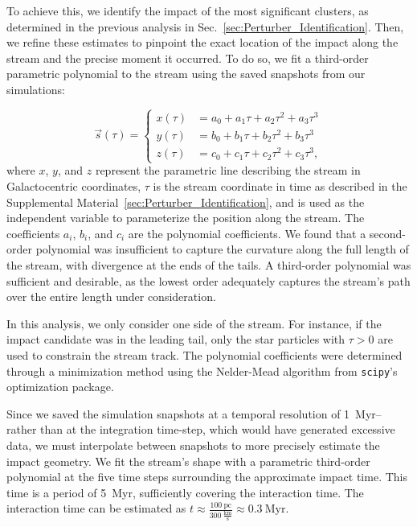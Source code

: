         To achieve this, we identify the impact of the most significant clusters, as determined in the previous analysis in Sec.~\ref{sec:Perturber_Identification}. Then, we refine these estimates to pinpoint the exact location of the impact along the stream and the precise moment it occurred. To do so, we fit a third-order parametric polynomial to the stream using the saved snapshots from our simulations:

        \begin{equation}
            \vec{s}(\tau) = 
            \left\{
            \begin{aligned}
                x(\tau) &= a_0 + a_1 \tau + a_2 \tau^2 + a_3 \tau^3 \\ 
                y(\tau) &= b_0 + b_1 \tau + b_2 \tau^2 + b_3 \tau^3 \\
                z(\tau) &= c_0 + c_1 \tau + c_2 \tau^2 + c_3 \tau^3,
            \end{aligned}
            \right.
        \end{equation}
        where $x$, $y$, and $z$ represent the parametric line describing the stream in Galactocentric coordinates, $\tau$ is the stream coordinate in time as described in the Supplemental Material~\ref{sec:Perturber_Identification}, and is used as the independent variable to parameterize the position along the stream. The coefficients $a_i$, $b_i$, and $c_i$ are the polynomial coefficients. We found that a second-order polynomial was insufficient to capture the curvature along the full length of the stream, with divergence at the ends of the tails. A third-order polynomial was sufficient and desirable, as the lowest order adequately captures the stream's path over the entire length under consideration.

        In this analysis, we only consider one side of the stream. For instance, if the impact candidate was in the leading tail, only the star particles with $\tau > 0$ are used to constrain the stream track. The polynomial coefficients were determined through a minimization method using the Nelder-Mead algorithm from \texttt{scipy}'s optimization package.

        Since we saved the simulation snapshots at a temporal resolution of 1~Myr--rather than at the integration time-step, which would have generated excessive data, we must interpolate between snapshots to more precisely estimate the impact geometry. We fit the stream's shape with a parametric third-order polynomial at the five time steps surrounding the approximate impact time. This time is a period of 5~Myr, sufficiently covering the interaction time. The interaction time can be estimated as $t \approx \frac{100~\text{pc}}{300~\frac{\text{km}}{\text{s}}} \approx 0.3~\text{Myr}$.

